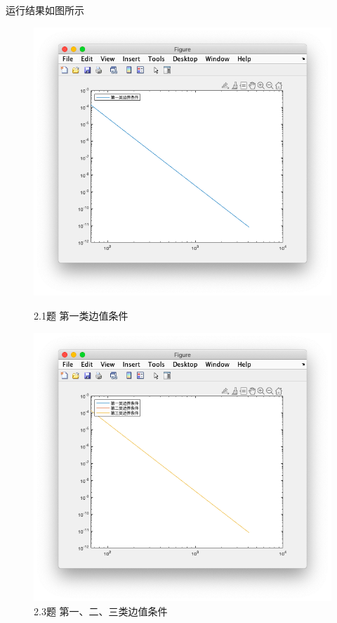 \documentclass[]{report}
\begin{document}
		运行结果如图所示
		\begin{figure}[h!]
			\centering
			\begin{minipage}{20em}
				\centering
				\includegraphics[scale = 0.3]{images/1_2_1.png}
				\caption{2.1题 第一类边值条件}
			\end{minipage}
			\begin{minipage}{20em}
				\centering
				\includegraphics[scale = 0.3]{images/1_2_3.png}
				\caption{2.3题 第一、二、三类边值条件}
			\end{minipage}
		\end{figure}
\end{document}
